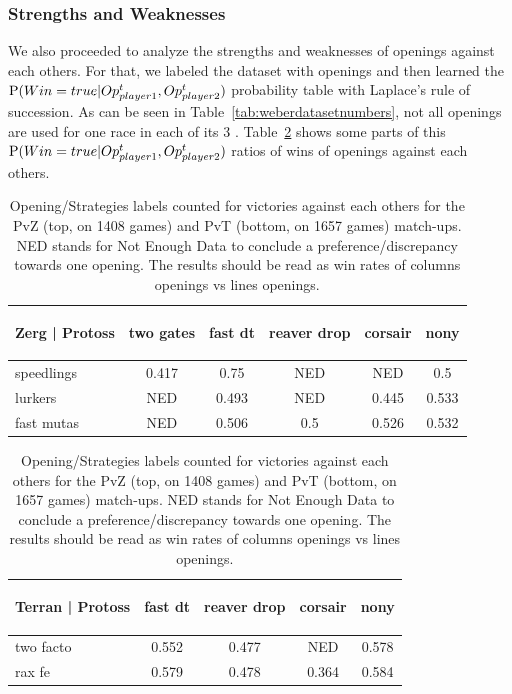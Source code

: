 \subsubsection{Strengths and Weaknesses}

We also proceeded to analyze the strengths and weaknesses of openings against each others. For that, we labeled the dataset with openings and then learned the $\mathrm{P}(Win=true|Op_{player1}^t,Op_{player2}^t)$ probability table with Laplace's rule of succession. As can be seen in Table~\ref{tab:weberdatasetnumbers}, not all openings are used for one race in each of its 3 . Table~\ref{table:openingcontingency} shows some parts of this $\mathrm{P}(Win=true|Op_{player1}^t,Op_{player2}^t)$ ratios of wins of openings against each others.

\begin{table}[ht] 
\begin{center}
\begin{small}
\begin{tabular}{|l|ccccc|}
\hline
\begin{tiny}Zerg | Protoss\end{tiny} & two gates & fast dt & reaver drop & corsair & nony\\
\hline
speedlings &  0.417& 0.75 & NED & NED & 0.5 \\
lurkers &  NED & 0.493& NED & 0.445 & 0.533\\
fast mutas &  NED & 0.506& 0.5 & 0.526& 0.532\\
\hline
\end{tabular}
\begin{tabular}{|l|cccc|}
\hline
\begin{tiny}Terran | Protoss\end{tiny} & fast dt & reaver drop & corsair & nony\\
\hline
two facto &  0.552& 0.477& NED & 0.578\\
rax fe &  0.579& 0.478& 0.364& 0.584\\
\hline
\end{tabular}
\end{small}
\caption{Opening/Strategies labels counted for victories against each others for the PvZ (top, on 1408 games) and PvT (bottom, on 1657 games) match-ups. NED stands for Not Enough Data to conclude a preference/discrepancy towards one opening. The results should be read as win rates of columns openings vs lines openings.}
\end{center}
\label{table:openingcontingency}
\end{table}

